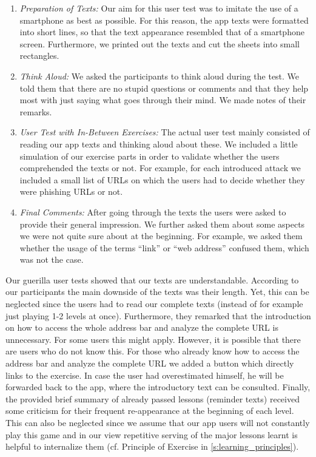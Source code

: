 \begin{enumerate}
	\item\textit{Preparation of Texts:} Our aim for this user test was to imitate the use of a smartphone as best as possible.
	For this reason, the app texts were formatted into short lines, so that the text appearance resembled that of a smartphone screen.
	Furthermore, we printed out the texts and cut the sheets into small rectangles.
	\item\textit{Think Aloud:} We asked the participants to think aloud during the test. 
	We told them that there are no stupid questions or comments and that they help most with just saying what goes through their mind.
	We made notes of their remarks.
	\item\textit{User Test with In-Between Exercises:} The actual user test mainly consisted of reading our app texts and thinking aloud about these.
	We included a little simulation of our exercise parts in order to validate whether the users comprehended the texts or not.
	For example, for each introduced attack we included a small list of URLs on which the users had to decide whether they were phishing URLs or not.
	\item\textit{Final Comments:} After going through the texts the users were asked to provide their general impression.
	We further asked them about some aspects we were not quite sure about at the beginning. 
	For example, we asked them whether the usage of the terms ``link'' or ``web address'' confused them, which was not the case.
\end{enumerate}
Our guerilla user tests showed that our texts are understandable.
According to our participants the main downside of the texts was their length. 
Yet, this can be neglected since the users had to read our complete texts (instead of for example just playing 1-2 levels at once). 
Furthermore, they remarked that the introduction on how to access the whole address bar and analyze the complete URL is unnecessary. 
For some users this might apply. 
However, it is possible that there are users who do not know this. 
For those who already know how to access the address bar and analyze the complete URL we added a button which directly links to the exercise. 
In case the user had overestimated himself, he will be forwarded back to the app, where the introductory text can be consulted. 
Finally, the provided brief summary of already passed lessons (reminder texts) received some criticism for their frequent re-appearance at the beginning of each level. 
This can also be neglected since we assume that our app users will not constantly play this game and in our view repetitive serving of the major lessons learnt is helpful to internalize them (cf. Principle of Exercise in \autoref{s:learning_principles}). 
